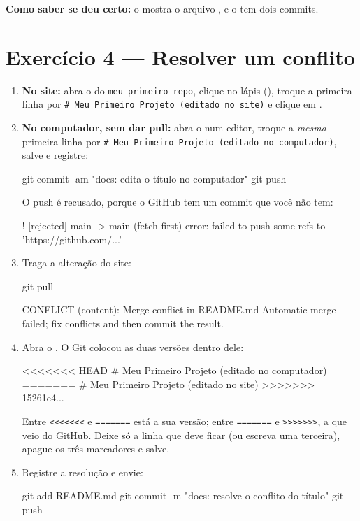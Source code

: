 \textbf{Como saber se deu certo:} o  mostra o arquivo
, e o  tem dois commits.

\section{Exercício 4 — Resolver um conflito}

\begin{enumerate}
  \item \textbf{No site:} abra o  do
        \texttt{meu-primeiro-repo}, clique no lápis (), troque a
        primeira linha por \texttt{\# Meu Primeiro Projeto (editado no site)}
        e clique em .
  \item \textbf{No computador, sem dar pull:} abra o  num
        editor, troque a \emph{mesma} primeira linha por
        \texttt{\# Meu Primeiro Projeto (editado no computador)}, salve e
        registre:
\begin{bashcode}
git commit -am "docs: edita o título no computador"
git push
\end{bashcode}
  O push é recusado, porque o GitHub tem um commit que você não tem:
\begin{saida}
 ! [rejected]        main -> main (fetch first)
error: failed to push some refs to 'https://github.com/...'
\end{saida}

  \item Traga a alteração do site:
\begin{bashcode}
git pull
\end{bashcode}
\begin{saida}
CONFLICT (content): Merge conflict in README.md
Automatic merge failed; fix conflicts and then commit the result.
\end{saida}

  \item Abra o . O Git colocou as duas versões dentro dele:
\begin{saida}
<<<<<<< HEAD
# Meu Primeiro Projeto (editado no computador)
=======
# Meu Primeiro Projeto (editado no site)
>>>>>>> 15261e4...
\end{saida}
  Entre \texttt{<<<<<<<} e \texttt{=======} está a sua versão; entre
  \texttt{=======} e \texttt{>>>>>>>}, a que veio do GitHub. Deixe só a
  linha que deve ficar (ou escreva uma terceira), apague os três marcadores e
  salve.

  \item Registre a resolução e envie:
\begin{bashcode}
git add README.md
git commit -m "docs: resolve o conflito do título"
git push
\end{bashcode}
\end{enumerate}

